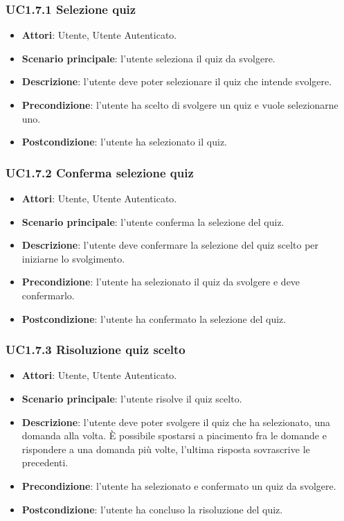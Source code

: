 \subsubsection{UC1.7.1 Selezione quiz}
\begin{itemize}
\item \textbf{Attori}: Utente, Utente Autenticato.
\item \textbf{Scenario principale}: l'utente seleziona il quiz da svolgere.
\item \textbf{Descrizione}: l'utente deve poter selezionare il quiz che intende svolgere.
\item \textbf{Precondizione}: l'utente ha scelto di svolgere un quiz e vuole selezionarne uno.
\item \textbf{Postcondizione}: l'utente ha selezionato il quiz.
\end{itemize}
\subsubsection{UC1.7.2 Conferma selezione quiz}
\begin{itemize}
\item \textbf{Attori}: Utente, Utente Autenticato.
\item \textbf{Scenario principale}: l'utente conferma la selezione del quiz.
\item \textbf{Descrizione}: l'utente deve confermare la selezione del quiz scelto per iniziarne lo svolgimento.
\item \textbf{Precondizione}: l'utente ha selezionato il quiz da svolgere e deve confermarlo.
\item \textbf{Postcondizione}: l'utente ha confermato la selezione del quiz.
\end{itemize}
\subsubsection{UC1.7.3 Risoluzione quiz scelto}
\begin{itemize}
\item \textbf{Attori}: Utente, Utente Autenticato.
\item \textbf{Scenario principale}: l'utente risolve il quiz scelto.
\item \textbf{Descrizione}: l'utente deve poter svolgere il quiz che ha selezionato, una domanda alla volta. È possibile spostarsi a piacimento fra le domande e rispondere a una domanda più volte, l'ultima risposta sovrascrive le precedenti.
\item \textbf{Precondizione}: l'utente ha selezionato e confermato un quiz da svolgere.
\item \textbf{Postcondizione}: l'utente ha concluso la risoluzione del quiz.
\end{itemize}
